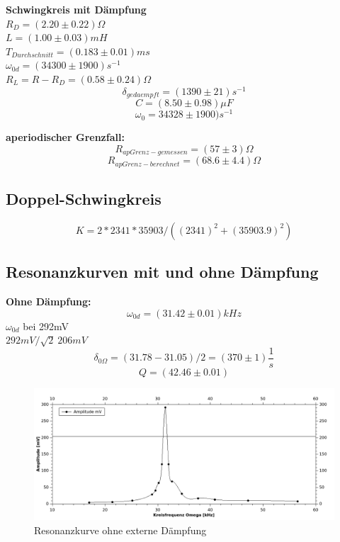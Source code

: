 \documentclass[12pt,a4paper]{article}
\begin{document}
\begin{multicols}{2}


\noindent \textbf{Schwingkreis mit Dämpfung}\\

\noindent $R_D = (2.20\pm 0.22)\Omega$\\
$L=(1.00 \pm 0.03)mH$\\
$T_{Durchschnitt}%
= (0.183  \pm 0.01) ms$\\
$\omega_{0d} = (34300 \pm 1900)s^{-1}$\\
$R_L = R-R_D = (0.58 \pm 0.24)\Omega$ 
$$\delta_{gedaempft} = (1390 \pm 21)s^{-1}$$
$$C = (8.50 \pm 0.98)\mu F$$
$$\omega_{0} = 34328 \pm 1900)s^{-1}$$


\noindent \textbf{aperiodischer Grenzfall:}
$$R_{apGrenz-gemessen} = (57\pm 3)\Omega$$
$$R_{apGrenz-berechnet}=(68.6 \pm 4.4)\Omega$$

\subsection{Doppel-Schwingkreis}
$$K = 2*2341*35903 /((2341)^2+(35903.9)^2)$$

\subsection{Resonanzkurven mit und ohne Dämpfung}
\textbf{Ohne Dämpfung:}\\
$$\omega_{0d} = (31.42 \pm 0.01) kHz$$
$\omega_{0d}$ bei 292mV\\
$292mV / \sqrt{2} ~ 206mV$\\
$$\delta_{0 \Omega} = (31.78 - 31.05)/2 = (370 \pm 1)  \frac{1}{s}$$
$$Q = (42.46 \pm 0.01)$$ 

\end{multicols}
\begin{figure}[H]
	\centering
	\includegraphics[scale=1.2]{./figure/resonanz_ohne_ext_daempf.png}
	\caption{Resonanzkurve ohne externe Dämpfung}
	\label{fig:resonanz_ohne}
\end{figure}
\end{document}
